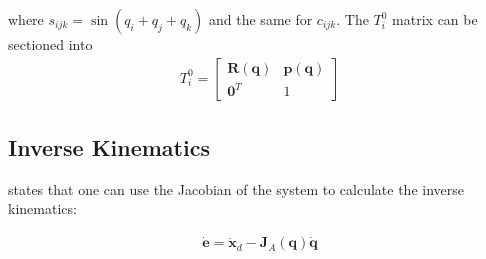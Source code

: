 where $s_{ijk} = \sin{(q_i + q_j + q_k)}$ and the same for $c_{ijk}$. The $T_i^0$ matrix can be sectioned into \begin{align*}
 T_i^0 = 
    \begin{bmatrix}
        \bm{R}(\bm{q}) & \bm{p}(\bm{q})\\
        \bm{0}^T & 1
    \end{bmatrix}    
\end{align*}

\subsection*{Inverse Kinematics}
\cite{Siciliano} states that one can use the Jacobian of the system to calculate the inverse kinematics:

\begin{align}\label{eq:algo}
\dot{\bm{e}} = \dot{\bm{x}}_d - \bm{J}_A(\bm{q})\dot{\bm{q}}
\end{align}

